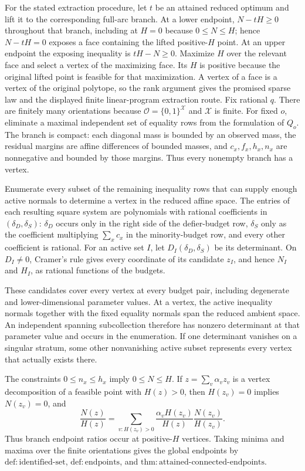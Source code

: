 For the stated extraction procedure, let \(t\) be an attained reduced optimum and lift it to the corresponding full-arc branch. At a lower endpoint, \(N-tH\geq0\) throughout that branch, including at \(H=0\) because \(0\leq N\leq H\); hence \(N-tH=0\) exposes a face containing the lifted positive-\(H\) point. At an upper endpoint the exposing inequality is \(tH-N\geq0\). Maximize \(H\) over the relevant face and select a vertex of the maximizing face. Its \(H\) is positive because the original lifted point is feasible for that maximization. A vertex of a face is a vertex of the original polytope, so the rank argument gives the promised sparse law and the displayed finite linear-program extraction route.
Fix rational \(q\). There are finitely many orientations because \(\mathcal O=\{0,1\}^{\mathcal X}\) and \(\mathcal X\) is finite. For fixed \(o\), eliminate a maximal independent set of equality rows from the formulation of \(Q_o\). The branch is compact: each diagonal mass is bounded by an observed mass, the residual margins are affine differences of bounded masses, and \(c_x,f_x,h_x,n_x\) are nonnegative and bounded by those margins. Thus every nonempty branch has a vertex.

Enumerate every subset of the remaining inequality rows that can supply enough active normals to determine a vertex in the reduced affine space. The entries of each resulting square system are polynomials with rational coefficients in \((\delta_D,\delta_S)\): \(\delta_D\) occurs only in the right side of the defier-budget row, \(\delta_S\) only as the coefficient multiplying \(\sum_xc_x\) in the minority-budget row, and every other coefficient is rational. For an active set \(I\), let \(D_I(\delta_D,\delta_S)\) be its determinant. On \(D_I\neq0\), Cramer's rule gives every coordinate of its candidate \(z_I\), and hence \(N_I\) and \(H_I\), as rational functions of the budgets.

These candidates cover every vertex at every budget pair, including degenerate and lower-dimensional parameter values. At a vertex, the active inequality normals together with the fixed equality normals span the reduced ambient space. An independent spanning subcollection therefore has nonzero determinant at that parameter value and occurs in the enumeration. If one determinant vanishes on a singular stratum, some other nonvanishing active subset represents every vertex that actually exists there.

The constraints \(0\leq n_x\leq h_x\) imply \(0\leq N\leq H\). If \(z=\sum_v\alpha_vz_v\) is a vertex decomposition of a feasible point with \(H(z)>0\), then \(H(z_v)=0\) implies \(N(z_v)=0\), and
\[
 \frac{N(z)}{H(z)}
 =\sum_{v:H(z_v)>0}
 \frac{\alpha_vH(z_v)}{H(z)}
 \frac{N(z_v)}{H(z_v)}.
\]
Thus branch endpoint ratios occur at positive-\(H\) vertices. Taking minima and maxima over the finite orientations gives the global endpoints by \(\mathrm{def:identified\text{-}set}\), \(\mathrm{def:endpoints}\), and \(\mathrm{thm:attained\text{-}connected\text{-}endpoints}\).

